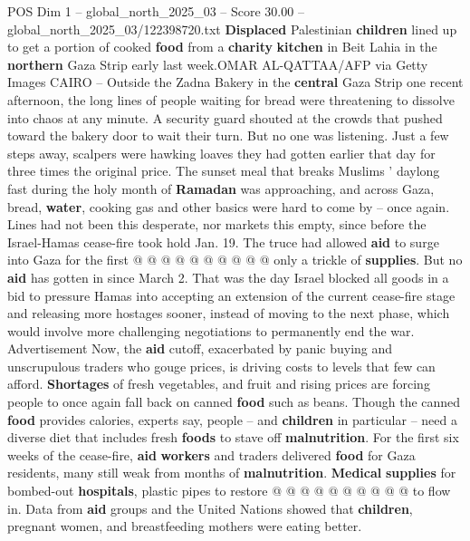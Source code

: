 \begin{textsample}{POS Dim 1 – global\_north\_2025\_03 – Score 30.00 – global\_north\_2025\_03/122398720.txt}  \label{ex:f1_pos_396}
\textbf{Displaced} Palestinian \textbf{children} lined up to get a portion of cooked \textbf{food} from a \textbf{charity} \textbf{kitchen} in Beit Lahia in the \textbf{northern} Gaza Strip early last week.OMAR AL-QATTAA/AFP via Getty Images CAIRO -- Outside the Zadna Bakery in the \textbf{central} Gaza Strip one recent afternoon, the long lines of people waiting for bread were threatening to dissolve into chaos at any minute.
A security guard shouted at the crowds that pushed toward the bakery door to wait their turn.
But no one was listening.
Just a few steps away, scalpers were hawking loaves they had gotten earlier that day for three times the original price.
The sunset meal that breaks Muslims ' daylong fast during the holy month of \textbf{Ramadan} was approaching, and across Gaza, bread, \textbf{water}, cooking gas and other basics were hard to come by -- once again.
Lines had not been this desperate, nor markets this empty, since before the Israel-Hamas cease-fire took hold Jan. 19.
The truce had allowed \textbf{aid} to surge into Gaza for the first @ @ @ @ @ @ @ @ @ @ only a trickle of \textbf{supplies}.
But no \textbf{aid} has gotten in since March 2.
That was the day Israel blocked all goods in a bid to pressure Hamas into accepting an extension of the current cease-fire stage and releasing more hostages sooner, instead of moving to the next phase, which would involve more challenging negotiations to permanently end the war.
Advertisement Now, the \textbf{aid} cutoff, exacerbated by panic buying and unscrupulous traders who gouge prices, is driving costs to levels that few can afford. \textbf{Shortages} of fresh vegetables, and fruit and rising prices are forcing people to once again fall back on canned \textbf{food} such as beans.
Though the canned \textbf{food} provides calories, experts say, people -- and \textbf{children} in particular -- need a diverse diet that includes fresh \textbf{foods} to stave off \textbf{malnutrition}.
For the first six weeks of the cease-fire, \textbf{aid} \textbf{workers} and traders delivered \textbf{food} for Gaza residents, many still weak from months of \textbf{malnutrition}. \textbf{Medical} \textbf{supplies} for bombed-out \textbf{hospitals}, plastic pipes to restore @ @ @ @ @ @ @ @ @ @ to flow in.
Data from \textbf{aid} groups and the United Nations showed that \textbf{children}, pregnant women, and breastfeeding mothers were eating better.

\end{textsample}
